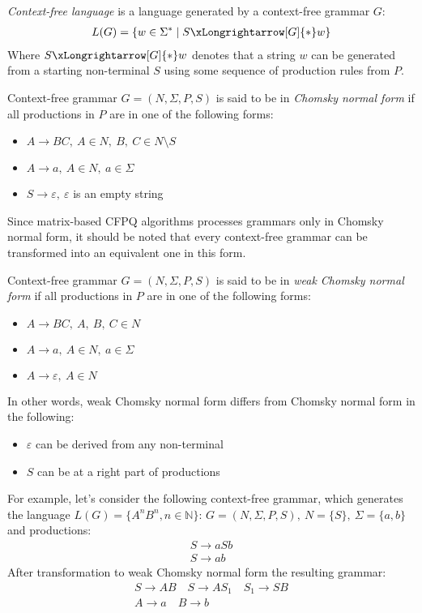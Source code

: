 \begin{definition} \emph{Context-free language} is a language generated by a context-free grammar $G$:
\begin{align*}
     L(G) = \{w \in \Sigma^* \mid S \xLongrightarrow[G]{*} w \} 
\end{align*}
Where $S \xLongrightarrow[G]{*} w$  denotes that a string $w$ can be generated from a starting non-terminal $S$ using some sequence of production rules from $P$.
\end{definition}
\begin{definition} Context-free grammar $G = (N, \Sigma, P, S)$ is said to be in \emph{Chomsky normal form} if all productions in $P$ are in one of the following forms:
    \begin{itemize}
        \item $A \rightarrow BC,~A \in N,~B,~C \in N \setminus S$
        \item  $A \rightarrow a,~A \in N,~a \in \Sigma$
        \item $S \rightarrow \varepsilon,~\varepsilon$ is an empty string
    \end{itemize}
\end{definition}
 Since matrix-based CFPQ algorithms processes grammars only in Chomsky normal form, it should be noted that every context-free grammar can be transformed into an equivalent one in this form. 
\begin{definition} Context-free grammar $G = (N, \Sigma, P, S)$ is said to be in \emph{weak Chomsky normal form} if all productions in $P$ are in one of the following forms:
    \begin{itemize}
        \item $A \rightarrow BC,~A,~B,~C \in N$
        \item  $A \rightarrow a,~A \in N,~a \in \Sigma$
        \item $A \rightarrow \varepsilon,~A \in N$
    \end{itemize}
\end{definition}
In other words, weak Chomsky normal form differs from Chomsky normal form in the following:
\begin{itemize}
    \item $\varepsilon$ can be derived from any non-terminal
    \item $S$ can be at a right part of productions
\end{itemize}
    
For example, let's consider the following context-free grammar, which generates the language $L(G) = \{A^nB^n, n \in \mathbb{N}\}$:
$G=(N, \Sigma, P, S), ~N=\{S\},~\Sigma=\{a,b\}$ and productions: 
\begin{align*}
S \rightarrow aSb\\
S \rightarrow ab
\end{align*}
After transformation to weak Chomsky normal form the resulting grammar:
\begin{gather*}
S \rightarrow AB  \quad S \rightarrow AS_1 \quad S_1 \rightarrow SB \\
A \rightarrow a \quad B \rightarrow b \quad
\end{gather*}

